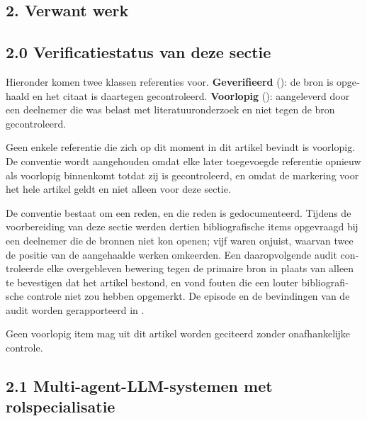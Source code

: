 \begin{dutch}
\section*{2. Verwant werk}
\label{sec:nl:2}


\subsection*{2.0 Verificatiestatus van deze sectie}
\label{sec:nl:2.0}

Hieronder komen twee klassen referenties voor. \textbf{Geverifieerd} (\gcheck{}): de bron is opgehaald en het citaat is daartegen gecontroleerd. \textbf{Voorlopig} (\gwarn{}): aangeleverd door een deelnemer die was belast met literatuuronderzoek en niet tegen de bron gecontroleerd.

Geen enkele referentie die zich op dit moment in dit artikel bevindt is voorlopig. De conventie wordt aangehouden omdat elke later toegevoegde referentie opnieuw als voorlopig binnenkomt totdat zij is gecontroleerd, en omdat de markering voor het hele artikel geldt en niet alleen voor deze sectie.

De conventie bestaat om een reden, en die reden is gedocumenteerd. Tijdens de voorbereiding van deze sectie werden dertien bibliografische items opgevraagd bij een deelnemer die de bronnen niet kon openen; vijf waren onjuist, waarvan twee de positie van de aangehaalde werken omkeerden. Een daaropvolgende audit controleerde elke overgebleven bewering tegen de primaire bron in plaats van alleen te bevestigen dat het artikel bestond, en vond fouten die een louter bibliografische controle niet zou hebben opgemerkt. De episode en de bevindingen van de audit worden gerapporteerd in .

Geen voorlopig item mag uit dit artikel worden geciteerd zonder onafhankelijke controle.


\subsection*{2.1 Multi-agent-LLM-systemen met rolspecialisatie}
\label{sec:nl:2.1}


\end{dutch}
